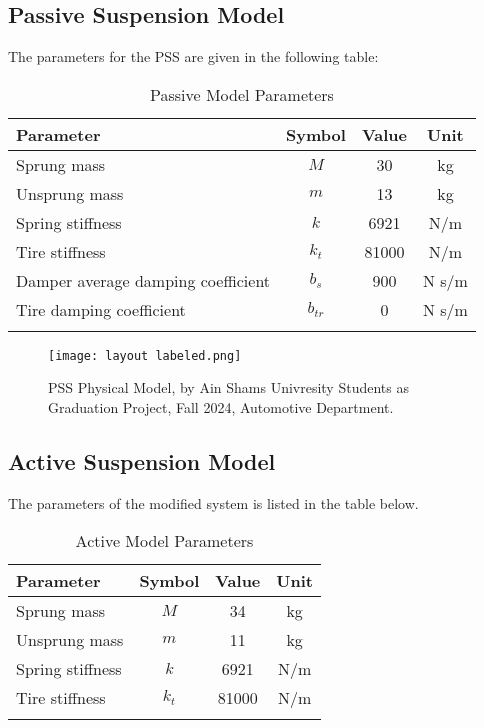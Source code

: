 \newpage
\subsection{Passive Suspension Model}
The parameters for the PSS are given in the following table:

\begin{table}[h]
	\centering
	\caption{Passive Model Parameters}
	\begin{tabular}{lccc}
		
		\hline
		\textbf{Parameter} & \textbf{Symbol} & \textbf{Value}  & \textbf{Unit}  \\
		\hline
		
		Sprung mass & \( M\)& 30 & kg\\
		Unsprung mass & \( m \)& 13 & kg\\
		Spring stiffness & \( k \)& 6921 & N/m\\ 
		Tire stiffness & \( k_{t} \)& 81000 & N/m\\
		Damper average damping coefficient & \( b_{s} \)& 900 & N s/m\\
		Tire damping coefficient & \( b_{tr} \)& 0 & N s/m\\
		
		\hline
		\label{table:Parameter}
	\end{tabular}
\end{table}
\begin{figure}[H]
	\centering
	\texttt{[image: layout labeled.png]}
	\caption{PSS Physical Model, by Ain Shams Univresity Students as Graduation Project, Fall 2024, Automotive Department.}
	\label{fig:Passive layout}
\end{figure}

\newpage
\subsection{Active Suspension Model}
The parameters of the modified system is listed in the table below.

\begin{table}[h]
	\centering
	\caption{Active Model Parameters}
	\begin{tabular}{lccc}
		
		\hline
		\textbf{Parameter} & \textbf{Symbol} & \textbf{Value}  & \textbf{Unit}  \\
		\hline
		
		Sprung mass & \( M \)& 34 & kg\\
		Unsprung mass & \( m \)& 11 & kg\\
		Spring stiffness & \( k \)& 6921 & N/m\\ 
		Tire stiffness & \( k_{t} \)& 81000 & N/m\\
		\hline
		\label{table:Parameter}
	\end{tabular}
\end{table}

